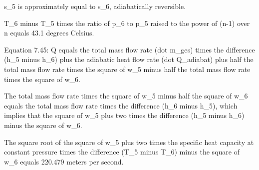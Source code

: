 s_5 is approximately equal to s_6, adiabatically reversible.

T_6 minus T_5 times the ratio of p_6 to p_5 raised to the power of (n-1) over n equals 43.1 degrees Celsius.

Equation 7.45: Q equals the total mass flow rate (dot m_ges) times the difference (h_5 minus h_6) plus the adiabatic heat flow rate (dot Q_adiabat) plus half the total mass flow rate times the square of w_5 minus half the total mass flow rate times the square of w_6.

The total mass flow rate times the square of w_5 minus half the square of w_6 equals the total mass flow rate times the difference (h_6 minus h_5), which implies that the square of w_5 plus two times the difference (h_5 minus h_6) minus the square of w_6.

The square root of the square of w_5 plus two times the specific heat capacity at constant pressure times the difference (T_5 minus T_6) minus the square of w_6 equals 220.479 meters per second.